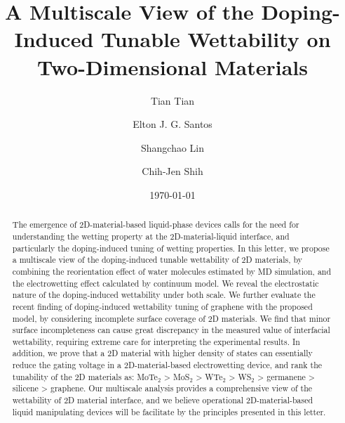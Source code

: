 \documentclass[aps,prl,reprint,groupedaddress,amsmath,amssymb, showpacs]{revtex4-1}
\date{}
\title{}
\begin{document}
\title{A Multiscale View of the Doping-Induced Tunable Wettability on Two-Dimensional Materials}
\author{Tian Tian} 
\author{Elton J. G. Santos}
\author{Shangchao Lin}
\author{Chih-Jen Shih}

\date{\today}

\begin{abstract}
  The emergence of 2D-material-based liquid-phase devices calls for
  the need for understanding the wetting property at the
  2D-material-liquid interface, and particularly the doping-induced
  tuning of wetting properties. In this letter, we propose a
  multiscale view of the doping-induced tunable wettability of 2D
  materials, by combining the reorientation effect of water molecules
  estimated by MD simulation, and the electrowetting effect calculated
  by continuum model. We reveal the electrostatic nature of the
  doping-induced wettability under both scale. We further evaluate the
  recent finding of doping-induced wettability tuning of graphene with
  the proposed model, by considering incomplete surface coverage of 2D
  materials. We find that minor surface incompleteness can cause great
  discrepancy in the measured value of interfacial wettability, requiring
  extreme care for interpreting the experimental results. In
  addition, we prove that a 2D material with higher density of states
  can essentially reduce the gating voltage in a 2D-material-based
  electrowetting device, and rank the tunability of the 2D materials
  as: MoTe$_{2}$ > MoS$_{2}$ > WTe$_{2}$ > WS$_{2}$ > germanene > silicene >
  graphene. Our multiscale analysis provides a comprehensive view of
  the wettability of 2D material interface, and we believe operational
  2D-material-based liquid manipulating devices will be facilitate by
  the principles presented in this letter.
\end{abstract}
\maketitle
\end{document}
